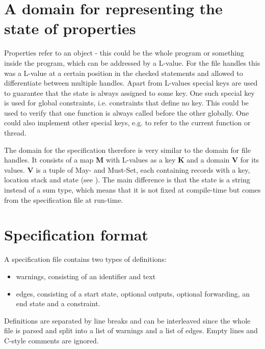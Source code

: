 

\section{A domain for representing the state of properties}
Properties refer to an object - this could be the whole program or something inside the program, which can be addressed by a L-value. For the file handles this was a L-value at a certain position in the checked statements and allowed to differentiate between multiple handles.
Apart from L-values special keys are used to guarantee that the state is always assigned to some key.
One such special key is used for global constraints, i.e. constraints that define no key. This could be used to verify that one function is always called before the other globally. One could also implement other special keys, e.g. to refer to the current function or thread.

The domain for the specification therefore is very similar to the domain for file handles. It consists of a map \textbf{M} with L-values as a key \textbf{K} and a domain \textbf{V} for its values. \textbf{V} is a tuple of May- and Must-Set, each containing records with a key, location stack and state (see ).
The main difference is that the state is a string instead of a sum type, which means that it is not fixed at compile-time but comes from the specification file at run-time.


\section{Specification format}
A specification file contains two types of definitions:
\begin{itemize}
\item warnings, consisting of an identifier and text
\item edges, consisting of a start state, optional outputs, optional forwarding, an end state and a constraint.
\end{itemize}
Definitions are separated by line breaks and can be interleaved since the whole file is parsed and split into a list of warnings and a list of edges. Empty lines and C-style comments are ignored.

